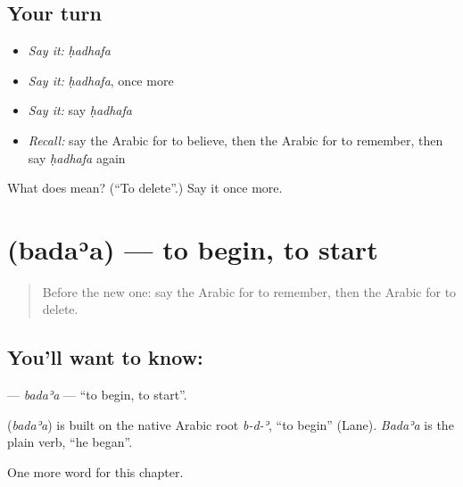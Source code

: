 \subsection*{Your turn}
\begin{itemize}
\raggedright
  \item \emph{Say it:} \emph{ḥadhafa}
  \item \emph{Say it:} \emph{ḥadhafa}, once more
  \item \emph{Say it:} say \emph{ḥadhafa}
  \item \emph{Recall:} say the Arabic for to believe, then the Arabic for to remember, then say \emph{ḥadhafa} again
\end{itemize}

\begin{tcolorbox}[breakable,colback=teal!4,colframe=teal!35!black,title={Before you move on}]
What does  mean? (\textquotedblleft{}To delete\textquotedblright{}.) Say it once more.
\end{tcolorbox}
\section[\texorpdfstring{\ar{بدأ} (badaʾa)}{بدأ (badaʾa)}]{ (badaʾa) — to begin, to start}

\label{lesson:AR-C165-badaa}



\begin{quote}
Before the new one: say the Arabic for to remember, then the Arabic for to delete.
\end{quote}

\subsection*{You'll want to know: }
\textbf{} — \emph{badaʾa} — \textquotedblleft{}to begin, to start\textquotedblright{}.

\begin{cousinweb}
\textbf{} (\emph{badaʾa}) is built on the native Arabic root \emph{b-d-ʾ}, \textquotedblleft{}to begin\textquotedblright{} (Lane). \emph{Badaʾa} is the plain verb, \textquotedblleft{}he began\textquotedblright{}.
\end{cousinweb}

\begin{grammarlens}[title={What you've built}]
One more word for this chapter.
\end{grammarlens}

